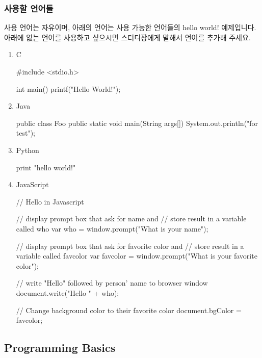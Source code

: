 \subsubsection{사용할 언어들}

사용 언어는 자유이며, 아래의 언어는 사용 가능한 언어들의 hello world! 예제입니다. 아래에 없는 언어를 사용하고 싶으시면 스터디장에게 말해서 언어를 추가해 주세요. 

\begin{enumerate}

\item C


\begin{C}
#include <stdio.h> 

int main()
{
	printf("Hello World!\n"); 
}
\end{C}

\item Java


\begin{Java}
public class Foo {
  public static void main(String args[]) {
    System.out.println("for test");
  }
}
\end{Java}

\item{Python}

\begin{Python}
print "hello world!"
\end{Python}

\item JavaScript

\begin{JavaScript}
// Hello in Javascript

// display prompt box that ask for name and 
// store result in a variable called who
var who = window.prompt("What is your name");

// display prompt box that ask for favorite color and 
// store result in a variable called favcolor
var favcolor = window.prompt("What is your favorite color");

// write "Hello" followed by person' name to browser window
document.write("Hello " + who);

// Change background color to their favorite color
document.bgColor = favcolor;
\end{JavaScript}

\end{enumerate}

\subsection{Programming Basics}


